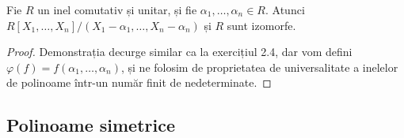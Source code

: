 \begin{exercise}[3.9]
Fie \(R\) un inel comutativ și unitar, și fie \(\alpha_1, \dots, \alpha_n \in R\).
Atunci \(R[X_1, \dots, X_n]/(X_1 - \alpha_1, \dots, X_n - \alpha_n)\) și \(R\) sunt izomorfe.
\end{exercise}
\begin{proof}
Demonstrația decurge similar ca la exercițiul 2.4, dar vom defini \(\varphi(f) = f(\alpha_1, \dots, \alpha_n)\), și ne folosim de proprietatea de universalitate a inelelor de polinoame într-un număr finit de nedeterminate. 
\end{proof}

\subsection{Polinoame simetrice}

\begin{comment}
\begin{exercise}[4.17]
Arătați că orice șir strict descrescător de monoame este finit.
\end{exercise}
\end{comment}

